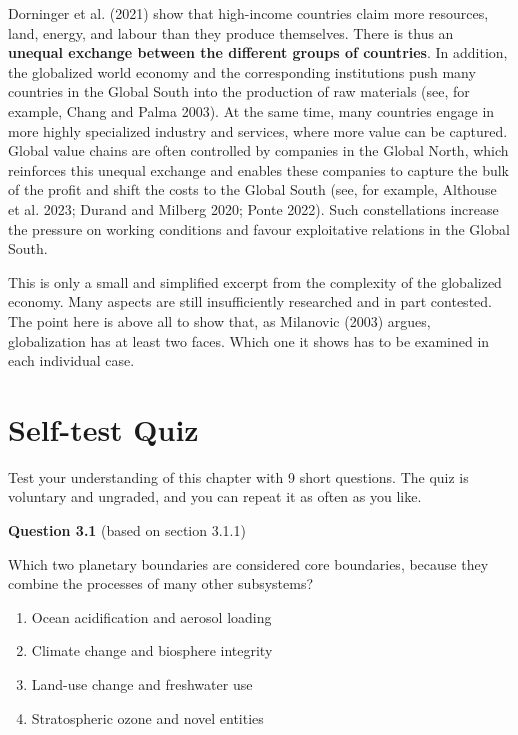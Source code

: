 \documentclass[
  british,
  a4paper,
  DIV=11,
  numbers=noendperiod,
  oneside,
  openany]{scrreprt}
\providecommand{\tightlist}{%
  \setlength{\itemsep}{0pt}\setlength{\parskip}{0pt}}
\begin{document}
Dorninger et al. (2021) show that high-income countries claim more
resources, land, energy, and labour than they produce themselves. There
is thus an \textbf{unequal exchange between the different groups of
countries}. In addition, the globalized world economy and the
corresponding institutions push many countries in the Global South into
the production of raw materials (see, for example, Chang and Palma
2003). At the same time, many countries engage in more highly
specialized industry and services, where more value can be captured.
Global value chains are often controlled by companies in the Global
North, which reinforces this unequal exchange and enables these
companies to capture the bulk of the profit and shift the costs to the
Global South (see, for example, Althouse et al. 2023; Durand and Milberg
2020; Ponte 2022). Such constellations increase the pressure on working
conditions and favour exploitative relations in the Global South.

This is only a small and simplified excerpt from the complexity of the
globalized economy. Many aspects are still insufficiently researched and
in part contested. The point here is above all to show that, as
Milanovic (2003) argues, globalization has at least two faces. Which one
it shows has to be examined in each individual case.

\section*{Self-test Quiz}\label{self-test-quiz-2}


Test your understanding of this chapter with 9 short questions. The quiz
is voluntary and ungraded, and you can repeat it as often as you like.

\textbf{Question 3.1} (based on section 3.1.1)

Which two planetary boundaries are considered core boundaries, because
they combine the processes of many other subsystems?

\begin{enumerate}
\def\labelenumi{\alph{enumi})}
\tightlist
\item
  Ocean acidification and aerosol loading
\item
  Climate change and biosphere integrity
\item
  Land-use change and freshwater use
\item
  Stratospheric ozone and novel entities
\end{enumerate}
\end{document}
